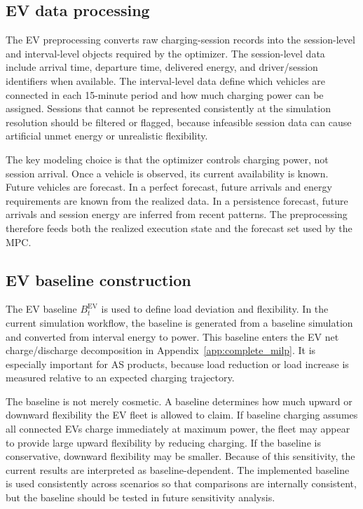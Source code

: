 \documentclass[final,5p,times]{elsarticle}
\newcommand{\EV}{\mathrm{EV}}
\begin{document}
\subsection{EV data processing}
The EV preprocessing converts raw charging-session records into the session-level and interval-level objects required by the optimizer. The session-level data include arrival time, departure time, delivered energy, and driver/session identifiers when available. The interval-level data define which vehicles are connected in each 15-minute period and how much charging power can be assigned. Sessions that cannot be represented consistently at the simulation resolution should be filtered or flagged, because infeasible session data can cause artificial unmet energy or unrealistic flexibility.

The key modeling choice is that the optimizer controls charging power, not session arrival. Once a vehicle is observed, its current availability is known. Future vehicles are forecast. In a perfect forecast, future arrivals and energy requirements are known from the realized data. In a persistence forecast, future arrivals and session energy are inferred from recent patterns. The preprocessing therefore feeds both the realized execution state and the forecast set used by the MPC.

\subsection{EV baseline construction}
The EV baseline $B_t^{\EV}$ is used to define load deviation and flexibility. In the current simulation workflow, the baseline is generated from a baseline simulation and converted from interval energy to power. This baseline enters the EV net charge/discharge decomposition in Appendix~\ref{app:complete_milp}. It is especially important for AS products, because load reduction or load increase is measured relative to an expected charging trajectory.

The baseline is not merely cosmetic. A baseline determines how much upward or downward flexibility the EV fleet is allowed to claim. If baseline charging assumes all connected EVs charge immediately at maximum power, the fleet may appear to provide large upward flexibility by reducing charging. If the baseline is conservative, downward flexibility may be smaller. Because of this sensitivity, the current results are interpreted as baseline-dependent. The implemented baseline is used consistently across scenarios so that comparisons are internally consistent, but the baseline should be tested in future sensitivity analysis.
\end{document}
